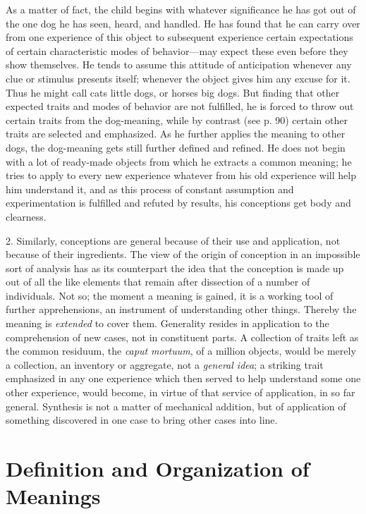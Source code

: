 \documentclass[letterpaper]{book}
\begin{document}
As a matter of fact, the child begins with whatever significance he has
got out of the one dog he has seen, heard, and handled. He has found
that he can carry over from one experience of this object to subsequent
experience certain expectations of certain characteristic modes of
behavior---may expect these even before they show themselves. He tends
to assume this attitude of anticipation whenever any clue or stimulus
presents itself; whenever the object gives him any excuse for it. Thus
he might call cats little dogs, or horses big dogs. But finding that
other expected traits and modes of behavior are not fulfilled, he is
forced to throw out certain traits from the dog-meaning, while by
contrast (see p. 90) certain other traits are selected and emphasized.
As he further applies the meaning to other dogs, the dog-meaning gets
still further defined and refined. He does not begin with a lot of
ready-made objects from which he extracts a common meaning; he tries to
apply to every new experience whatever from his old experience will help
him understand
it,
and as this process of constant assumption and experimentation is
fulfilled and refuted by results, his conceptions get body and
clearness.


2. Similarly, conceptions are general because of their use and
application, not because of their ingredients. The view of the origin of
conception in an impossible sort of analysis has as its counterpart the
idea that the conception is made up out of all the like elements that
remain after dissection of a number of individuals. Not so; the moment a
meaning is gained, it is a working tool of further apprehensions, an
instrument of understanding other things. Thereby the meaning is
\emph{extended} to cover them. Generality resides in application to the
comprehension of new cases, not in constituent parts. A collection of
traits left as the common residuum, the \emph{caput mortuum}, of a
million objects, would be merely a collection, an inventory or
aggregate, not a \emph{general idea}; a striking trait emphasized in any
one experience which then served to help understand some one other
experience, would become, in virtue of that service of application, in
so far general. Synthesis is not a matter of mechanical addition, but of
application of something discovered in one case to bring other cases
into line.

\section{Definition and Organization of Meanings}
\end{document}
